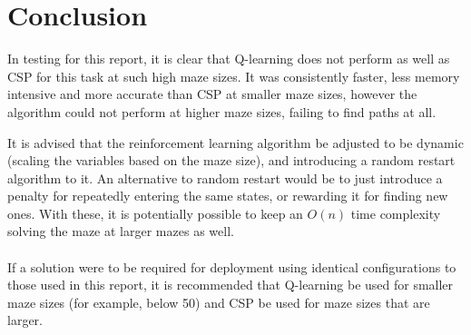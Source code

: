 \documentclass{article}
\newcommand\tab[1][1cm]{\hspace*{#1}}
\begin{document}
    \section{Conclusion}\label{sec:conclusion}

        \tab In testing for this report, it is clear that Q-learning does not 
        perform as well as CSP for this task at such high maze sizes. 
        It was consistently faster, less memory intensive and more accurate 
        than CSP at smaller maze sizes, however the algorithm could not perform 
        at higher maze sizes, failing to find paths at all.

        \tab It is advised that the reinforcement learning algorithm be adjusted
        to be dynamic (scaling the variables based on the maze size), and
        introducing a random restart algorithm to it. An alternative to random
        restart would be to just introduce a penalty for repeatedly entering the
        same states, or rewarding it for finding new ones. With these, it is
        potentially possible to keep an $O(n)$ time complexity solving the maze at
        larger mazes as well.
        \\ \\
        If a solution were to be required for deployment using identical 
        configurations to those used in this report, it is recommended that 
        Q-learning be used for smaller maze sizes (for example, below 50) and 
        CSP be used for maze sizes that are larger.

    
    
\end{document}
